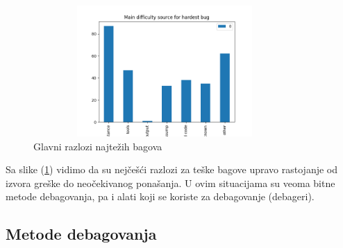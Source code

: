 \documentclass[a4paper]{article}
\begin{document}
\begin{figure}[h!]
	\begin{center}
		\includegraphics[width=100mm,height=50mm]{Slike/bagovi.png}
	\end{center}
	\caption{Glavni razlozi najtežih bagova\cite{study_bugs}}
	\label{fig:bagovi}
\end{figure}

Sa slike (\ref{fig:bagovi}) vidimo da su nejčešći razlozi za teške bagove upravo rastojanje od izvora greške do neočekivanog ponašanja. U ovim situacijama su veoma bitne metode debagovanja, pa i alati koji se koriste za debagovanje (debageri).

\subsection{Metode debagovanja}
\label{subsec:podnaslov2}
\end{document}
